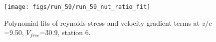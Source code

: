 \begin{figure}[H]
\centering
\texttt{[image: figs/run\_59/run\_59\_nut\_ratio\_fit]}
\caption{Polynomial fits of reynolds stress and velocity gradient terms at $z/c$=9.50, $V_{free}$=30.9, station 6.}
\label{fig:run_59_nut_ratio_fit}
\end{figure}


